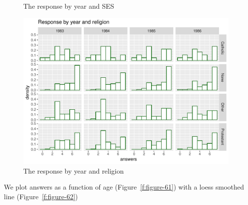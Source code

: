 \documentclass[11pt,letter]{article}\usepackage[]{graphicx}\usepackage[]{color}
\makeatletter
\def\maxwidth{ %
  \ifdim\Gin@nat@width>\linewidth
    \linewidth
  \else
    \Gin@nat@width
  \fi
}
\newenvironment{knitrout}{}{} %
\makeatother
\begin{document}
\begin{knitrout}
\begin{figure}[H]
{}

\caption[The response by year and SES]{The response by year and SES}\label{fig:figure-32}
\end{figure}

\begin{figure}[H]

{\centering \includegraphics[width=\maxwidth]{figure/figure-3-3} 

}

\caption[The response by year and religion]{The response by year and religion}\label{fig:figure-33}
\end{figure}


\end{knitrout}


We plot answers as a function of age (Figure~\ref{f:figure-61}) with a loess smoothed line (Figure~\ref{f:figure-62}) 
\end{document}
